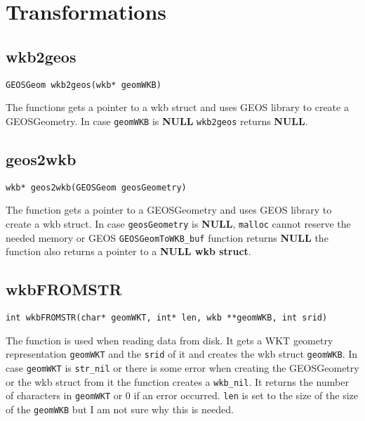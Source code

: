 \documentclass{article}
\begin{document}
\tableofcontents

\section{Transformations}

\subsection{wkb2geos}

{\tt GEOSGeom wkb2geos(wkb* geomWKB) }

\vspace{10pt}

\noindent
The functions gets a pointer to a wkb struct and uses GEOS library to create a 
GEOSGeometry. In case {\tt geomWKB} is {\bf NULL} {\tt wkb2geos} returns {\bf NULL}.


\subsection{geos2wkb}

{\tt wkb* geos2wkb(GEOSGeom geosGeometry)}

\vspace{10pt}

\noindent
The function gets a pointer to a GEOSGeometry and uses GEOS library to create a wkb struct.
In case {\tt geosGeometry} is {\bf NULL}, {\tt malloc} cannot reserve the needed memory 
or GEOS {\tt GEOSGeomToWKB\_buf} function returns {\bf NULL} the function also returns a pointer
to a {\bf NULL wkb struct}.


\subsection{wkbFROMSTR}

{\tt int wkbFROMSTR(char* geomWKT, int* len, wkb **geomWKB, int srid)}

\vspace{10pt}

\noindent
The function is used when reading data from disk. It gets a WKT geometry representation 
{\tt geomWKT} and the {\tt srid} of it and creates the wkb struct {\tt geomWKB}. In case 
{\tt geomWKT} is {\tt str\_nil} or there is some error when creating the GEOSGeometry or 
the wkb struct from it the function creates a {\tt wkb\_nil}. It returns the number of 
characters in {\tt geomWKT} or 0 if an error occurred. {\tt *len} is set to the size of the 
size of the {\tt geomWKB} but I am not sure why this is needed.
\end{document}
